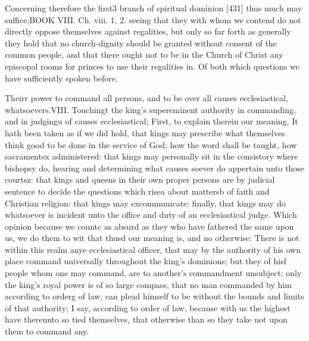 Concerning therefore the first3 branch of spiritual dominion [431] thus much may suffice;BOOK VIII. Ch. viii. 1, 2. seeing that they with whom we contend do not directly oppose themselves against regalities, but only so far forth as generally they hold that no church-dignity should be granted without consent of the common people, and that there ought not to be in the Church of Christ any episcopal rooms for princes to use their regalities in. Of both which questions we have sufficiently spoken before.

Theirr power to command all persons, and to be over all causes ecclesiastical, whatsoevers.VIII. Touchingt the king’s supereminent authority in commanding, and in judgingu of causes ecclesiastical; First, to explain therein our meaning, It hath been taken as if we did hold, that kings may prescribe what themselves think good to be done in the service of God; how the word shall be taught, how sacramentsx administered: that kings may personally sit in the consistory where bishopsy do, hearing and determining what causes soever do appertain unto those courtsz: that kings and queens in their own proper persons are by judicial sentence to decide the questions which risea about mattersb of faith and Christian religion: that kings may excommunicate: finally, that kings may do whatsoever is incident unto the office and duty of an ecclesiastical judge. Which opinion because we countc as absurd as they who have fathered the same upon us, we do them to wit that thusd our meaning is, and no otherwise: There is not within this realm anye ecclesiastical officer, that may by the authority of his own place command universally throughout the king’s dominions; but they of hisf people whom one may command, are to another’s commandment unsubject: only the king’s royal power is of so large compass, that no man commanded by him according to orderg of law, can plead himself to be without the bounds and limits of that authority; I say, according to order of law, because with us the highest have thereunto so tied themselves, that otherwise than so they take not upon them to command any.

